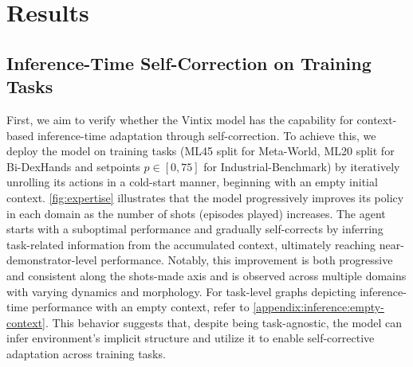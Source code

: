 \documentclass{article}
\theoremstyle{plain}
\theoremstyle{definition}
\theoremstyle{remark}
\begin{document}
\section{Results}
\label{sec:results}
\subsection{Inference-Time Self-Correction on Training Tasks}
First, we aim to verify whether the Vintix model has the capability for context-based inference-time adaptation through self-correction. To achieve this, we deploy the model on training tasks (ML45 split for Meta-World, ML20 split for Bi-DexHands and setpoints $p \in [0, 75]$ for Industrial-Benchmark) by iteratively unrolling its actions in a cold-start manner, beginning with an empty initial context. \cref{fig:expertise} illustrates that the model progressively improves its policy in each domain as the number of shots (episodes played) increases. The agent starts with a suboptimal performance and gradually self-corrects by inferring task-related information from the accumulated context, ultimately reaching near-demonstrator-level performance.
Notably, this improvement is both progressive and consistent along the shots-made axis and is observed across multiple domains with varying dynamics and morphology. For task-level graphs depicting inference-time performance with an empty context, refer to \cref{appendix:inference:empty-context}.
This behavior suggests that, despite being task-agnostic, the model can infer environment's implicit structure and utilize it to enable self-corrective adaptation across training tasks.
\end{document}
